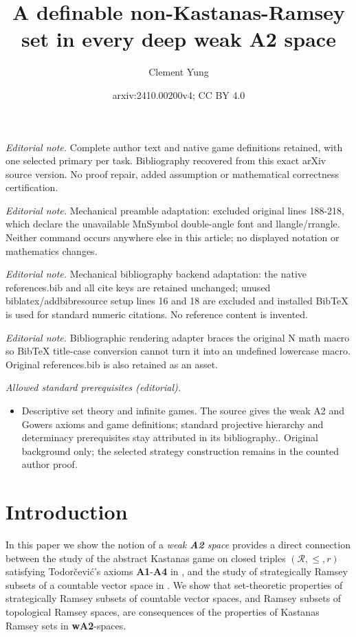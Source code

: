 \documentclass[11pt,reqno]{amsart}
\title{A definable non-Kastanas-Ramsey set in every deep weak A2 space}
\author{Clement Yung}
\date{arxiv:2410.00200v4; CC BY 4.0}
\theoremstyle{plain}
\numberwithin{equation}{section}
\theoremstyle{definition}
\newcommand{\cal}{\mathcal}
\begin{document}
\maketitle
\noindent\textit{Editorial note.} Complete author text and native game definitions retained, with one selected primary per task. Bibliography recovered from this exact arXiv source version. No proof repair, added assumption or mathematical correctness certification.\par\medskip
\noindent\textit{Editorial note.} Mechanical preamble adaptation: excluded original lines 188-218, which declare the unavailable MnSymbol double-angle font and llangle/rrangle. Neither command occurs anywhere else in this article; no displayed notation or mathematics changes.\par\medskip
\noindent\textit{Editorial note.} Mechanical bibliography backend adaptation: the native references.bib and all cite keys are retained unchanged; unused biblatex/addbibresource setup lines 16 and 18 are excluded and installed BibTeX is used for standard numeric citations. No reference content is invented.\par\medskip
\noindent\textit{Editorial note.} Bibliographic rendering adapter braces the original N math macro so BibTeX title-case conversion cannot turn it into an undefined lowercase macro. Original references.bib is also retained as an asset.\par\medskip
\noindent\textit{Allowed standard prerequisites (editorial).}\begin{itemize}
\item Descriptive set theory and infinite games. The source gives the weak A2 and Gowers axioms and game definitions; standard projective hierarchy and determinacy prerequisites stay attributed in its bibliography.. Original background only; the selected strategy construction remains in the counted author proof.
\end{itemize}\medskip
\section{Introduction}
In this paper we show the notion of a \emph{weak \textbf{A2} space} provides a direct connection between the study of the abstract Kastanas game on closed triples $(\cal{R},\leq,r)$ satisfying Todor\v{c}evi\'{c}'s axioms \textbf{A1}-\textbf{A4} in \cite{CD23}, and the study of strategically Ramsey subsets of a countable vector space in \cite{R08}. We show that set-theoretic properties of strategically Ramsey subsets of countable vector spaces, and Ramsey subsets of topological Ramsey spaces, are consequences of the properties of Kastanas Ramsey sets in \textbf{wA2}-spaces. 
\end{document}
